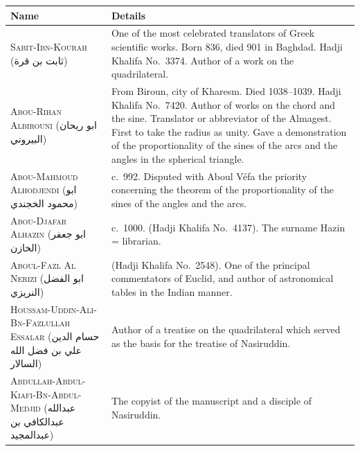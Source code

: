 \documentclass[11pt,a4paper]{article}
\theoremstyle{plain}
\theoremstyle{definition}
\theoremstyle{remark}
\newcommand{\ar}[1]{{\arabicfont\beginR #1\endR}}
\begin{document}
\begin{center}
\begin{longtable}{p{}p{}}
\toprule
\textbf{Name} & \textbf{Details} \\
\midrule
\endhead

\textsc{Sabit-Ibn-Kourah} (\ar{ثابت بن قرة}) & One of the most celebrated translators of Greek scientific works. Born 836, died 901 in Baghdad. Hadji Khalifa No.~3374. Author of a work on the quadrilateral. \\
\addlinespace[0.2cm]

\textsc{Abou-Rihan Albirouni} (\ar{ابو ريحان البيروني}) & From Biroun, city of Kharesm. Died 1038--1039. Hadji Khalifa No.~7420. Author of works on the chord and the sine. Translator or abbreviator of the Almagest. First to take the radius as unity. Gave a demonstration of the proportionality of the sines of the arcs and the angles in the spherical triangle. \\
\addlinespace[0.2cm]

\textsc{Abou-Mahmoud Alhodjendi} (\ar{ابو محمود الخجندي}) & c.~992. Disputed with Aboul V\'efa the priority concerning the theorem of the proportionality of the sines of the angles and the arcs. \\
\addlinespace[0.2cm]

\textsc{Abou-Djafar Alhazin} (\ar{ابو جعفر الخازن}) & c.~1000. (Hadji Khalifa No.~4137). The surname Hazin = librarian. \\
\addlinespace[0.2cm]

\textsc{Aboul-Fazl Al Nerizi} (\ar{ابو الفضل النريزي}) & (Hadji Khalifa No.~2548). One of the principal commentators of Euclid, and author of astronomical tables in the Indian manner. \\
\addlinespace[0.2cm]

\textsc{Houssam-Uddin-Ali-Bn-Fazlullah Essalar} (\ar{حسام الدين علي بن فضل الله السالار}) & Author of a treatise on the quadrilateral which served as the basis for the treatise of Nasiruddin. \\
\addlinespace[0.2cm]

\textsc{Abdullah-Abdul-Kiafi-Bn-Abdul-Medjid} (\ar{عبدالله عبدالكافي بن عبدالمجيد}) & The copyist of the manuscript and a disciple of Nasiruddin. \\

\bottomrule
\end{longtable}
\end{center}

\clearpage
\end{document}
